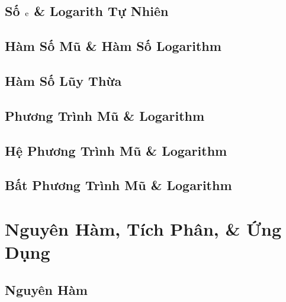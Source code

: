 \documentclass[12pt]{article}
\numberwithin{equation}{section}
\begin{document}

\subsection{Số $\rm e$ \& Logarith Tự Nhiên}


\subsection{Hàm Số Mũ \& Hàm Số Logarithm}


\subsection{Hàm Số Lũy Thừa}


\subsection{Phương Trình Mũ \& Logarithm}


\subsection{Hệ Phương Trình Mũ \& Logarithm}


\subsection{Bất Phương Trình Mũ \& Logarithm}


\section{Nguyên Hàm, Tích Phân, \& Ứng Dụng}

\subsection{Nguyên Hàm}
\end{document}
